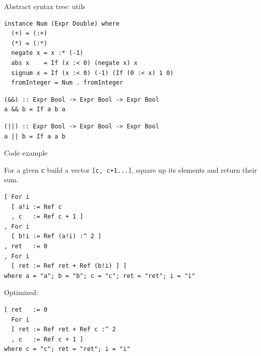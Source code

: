 \documentclass[handout]{beamer}
\begin{document}
\begin{frame}[fragile]{Abstract syntax tree: utils}

\begin{lstlisting}
instance Num (Expr Double) where
  (+) = (:+)
  (*) = (:*)
  negate x = x :* (-1)
  abs x    = If (x :< 0) (negate x) x
  signum x = If (x :< 0) (-1) (If (0 :< x) 1 0)
  fromInteger = Num . fromInteger
\end{lstlisting}

\begin{lstlisting}
(&&) :: Expr Bool -> Expr Bool -> Expr Bool
a && b = If a b a
\end{lstlisting}

\begin{lstlisting}
(||) :: Expr Bool -> Expr Bool -> Expr Bool
a || b = If a a b
\end{lstlisting}

\end{frame}

\begin{frame}[fragile]{Code example}

For a given {\tt c} build a vector {\tt [c, c+1...]}, square up its elements and return their sum.

\begin{lstlisting}
[ For i
  [ a!i := Ref c
  , c   := Ref c + 1 ]
, For i
  [ b!i := Ref (a!i) :^ 2 ]
, ret   := 0
, For i
  [ ret := Ref ret + Ref (b!i) ] ]
where a = "a"; b = "b"; c = "c"; ret = "ret"; i = "i"
\end{lstlisting}

Optimized:

\begin{lstlisting}
[ ret   := 0
  For i
  [ ret := Ref ret + Ref c :^ 2
  , c   := Ref c + 1 ]
where c = "c"; ret = "ret"; i = "i"
\end{lstlisting}

\end{frame}
\end{document}
